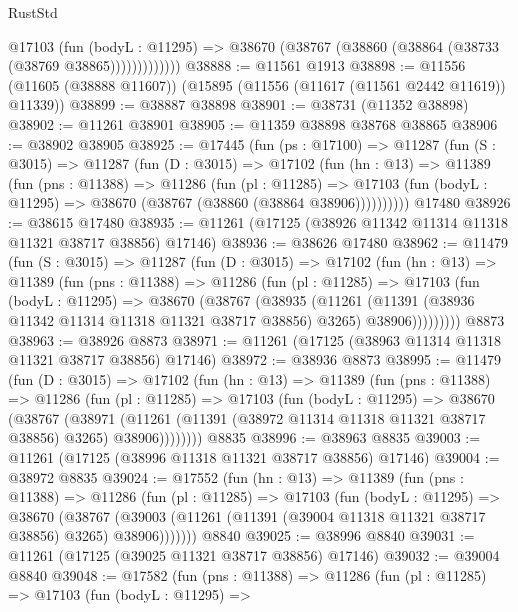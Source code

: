 \begin{lexlean}{RustStd}
\begin{coremodule}
                @17103
                  (fun (bodyL : @11295) =>
                  @38670 (@38767 (@38860 (@38864 (@38733 (@38769 @38865)))))))))))))
@38888 := @11561 @1913
@38898 := @11556 (@11605 (@38888 @11607)) (@15895 (@11556 (@11617 (@11561 @2442 @11619)) @11339))
@38899 := @38887 @38898
@38901 := @38731 (@11352 @38898)
@38902 := @11261 @38901
@38905 := @11359 @38898 @38768 @38865
@38906 := @38902 @38905
@38925 := @17445
    (fun (ps : @17100) =>
    @11287
      (fun (S : @3015) =>
      @11287
        (fun (D : @3015) =>
        @17102
          (fun (hn : @13) =>
          @11389
            (fun (pns : @11388) =>
            @11286
              (fun (pl : @11285) =>
              @17103 (fun (bodyL : @11295) => @38670 (@38767 (@38860 (@38864 @38906))))))))))
    @17480
@38926 := @38615 @17480
@38935 := @11261 (@17125 (@38926 @11342 @11314 @11318 @11321 @38717 @38856) @17146)
@38936 := @38626 @17480
@38962 := @11479
    (fun (S : @3015) =>
    @11287
      (fun (D : @3015) =>
      @17102
        (fun (hn : @13) =>
        @11389
          (fun (pns : @11388) =>
          @11286
            (fun (pl : @11285) =>
            @17103
              (fun (bodyL : @11295) =>
              @38670
                (@38767
                  (@38935
                    (@11261
                      (@11391 (@38936 @11342 @11314 @11318 @11321 @38717 @38856) @3265)
                      @38906)))))))))
    @8873
@38963 := @38926 @8873
@38971 := @11261 (@17125 (@38963 @11314 @11318 @11321 @38717 @38856) @17146)
@38972 := @38936 @8873
@38995 := @11479
    (fun (D : @3015) =>
    @17102
      (fun (hn : @13) =>
      @11389
        (fun (pns : @11388) =>
        @11286
          (fun (pl : @11285) =>
          @17103
            (fun (bodyL : @11295) =>
            @38670
              (@38767
                (@38971
                  (@11261 (@11391 (@38972 @11314 @11318 @11321 @38717 @38856) @3265) @38906))))))))
    @8835
@38996 := @38963 @8835
@39003 := @11261 (@17125 (@38996 @11318 @11321 @38717 @38856) @17146)
@39004 := @38972 @8835
@39024 := @17552
    (fun (hn : @13) =>
    @11389
      (fun (pns : @11388) =>
      @11286
        (fun (pl : @11285) =>
        @17103
          (fun (bodyL : @11295) =>
          @38670
            (@38767
              (@39003 (@11261 (@11391 (@39004 @11318 @11321 @38717 @38856) @3265) @38906)))))))
    @8840
@39025 := @38996 @8840
@39031 := @11261 (@17125 (@39025 @11321 @38717 @38856) @17146)
@39032 := @39004 @8840
@39048 := @17582
    (fun (pns : @11388) =>
    @11286
      (fun (pl : @11285) =>
      @17103
        (fun (bodyL : @11295) =>

\end{coremodule}
\end{lexlean}
